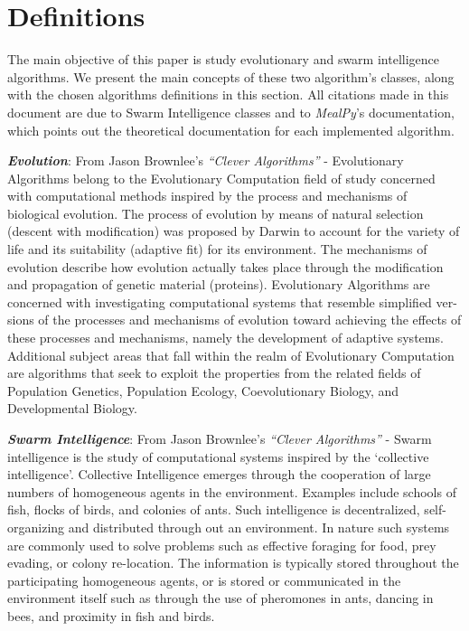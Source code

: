 \documentclass[conference]{IEEEtran}
\begin{document}
\section{Definitions}
\label{sec:definitions}

The main objective of this paper is study evolutionary and swarm intelligence algorithms.
We present the main concepts of these two algorithm's classes, along with the chosen algorithms
definitions in this section. All citations made in this document are due to Swarm Intelligence classes
and to \textit{MealPy}'s documentation, which points out the theoretical documentation for each
implemented algorithm.

\textit{\textbf{Evolution}}: From Jason Brownlee's \textit{``Clever Algorithms''} -
Evolutionary Algorithms belong to the Evolutionary Computation
field of study concerned with computational methods inspired by the process
and mechanisms of biological evolution. The process of evolution by
means of natural selection (descent with modification) was proposed by
Darwin to account for the variety of life and its suitability (adaptive
fit) for its environment. The mechanisms of evolution describe how
evolution actually takes place through the modification and propagation
of genetic material (proteins). Evolutionary Algorithms are concerned
with investigating computational systems that resemble simplified ver-
sions of the processes and mechanisms of evolution toward achieving
the effects of these processes and mechanisms, namely the development
of adaptive systems. Additional subject areas that fall within the realm
of Evolutionary Computation are algorithms that seek to exploit the
properties from the related fields of Population Genetics, Population
Ecology, Coevolutionary Biology, and Developmental Biology.

\textit{\textbf{Swarm Intelligence}}: From Jason Brownlee's \textit{``Clever Algorithms''} -
Swarm intelligence is the study of computational systems inspired by
the ‘collective intelligence’. Collective Intelligence emerges through the
cooperation of large numbers of homogeneous agents in the environment.
Examples include schools of fish, flocks of birds, and colonies of ants.
Such intelligence is decentralized, self-organizing and distributed through
out an environment. In nature such systems are commonly used to
solve problems such as effective foraging for food, prey evading, or
colony re-location. The information is typically stored throughout the
participating homogeneous agents, or is stored or communicated in
the environment itself such as through the use of pheromones in ants,
dancing in bees, and proximity in fish and birds.
\end{document}
